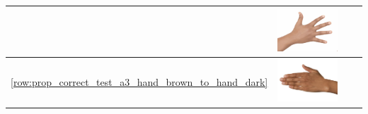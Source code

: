 \begin{longtable}{|c||c|c|c|}
\begin{minipage}{.29\textwidth}
  \end{minipage} & 
  \begin{minipage}{.29\textwidth}
    \includegraphics[width=\textwidth,height=\textheight,keepaspectratio]{../rc_test/outputs/20170517_proportional_corrected_test_alpha3/hand_dark_to_hand_light.jpg}
  \end{minipage} \\
    \hline  \ref{row:prop_correct_test_a3_hand_brown_to_hand_dark} &
  \begin{minipage}{.29\textwidth}
    \includegraphics[width=\textwidth,height=\textheight,keepaspectratio]{../inputs/hand_brown.jpg}
  \end{minipage} & 
  \begin{minipage}{.29\textwidth}

\end{minipage}
\end{longtable}
